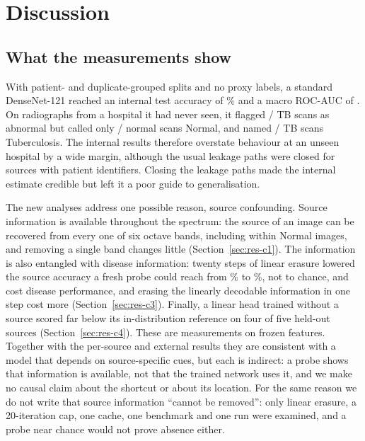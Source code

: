 \section{Discussion}
\label{sec:discussion}

\subsection{What the measurements show}
With patient- and duplicate-grouped splits and no proxy labels, a standard DenseNet-121 reached an internal test accuracy of \RTestAcc\% and a macro ROC-AUC of \RTestMacroAUC. On radiographs from a hospital it had never seen, it flagged \RExtSensK/\RExtSensN{} TB scans as abnormal but called only \RExtSpecK/\RExtSpecN{} normal scans Normal, and named \RExtTBK/\RExtTBN{} TB scans Tuberculosis. The internal results therefore overstate behaviour at an unseen hospital by a wide margin, although the usual leakage paths were closed for sources with patient identifiers. Closing the leakage paths made the internal estimate credible but left it a poor guide to generalisation.

The new analyses address one possible reason, source confounding. Source information is available throughout the spectrum: the source of an image can be recovered from every one of six octave bands, including within Normal images, and removing a single band changes little (Section~\ref{sec:res-c1}). The information is also entangled with disease information: twenty steps of linear erasure lowered the source accuracy a fresh probe could reach from \RInlpImgTestSrcBAKZero\% to \RInlpImgTestSrcBAKStar\%, not to chance, and cost disease performance, and erasing the linearly decodable information in one step cost more (Section~\ref{sec:res-c3}). Finally, a linear head trained without a source scored far below its in-distribution reference on four of five held-out sources (Section~\ref{sec:res-c4}). These are measurements on frozen features. Together with the per-source and external results they are consistent with a model that depends on source-specific cues, but each is indirect: a probe shows that information is available, not that the trained network uses it, and we make no causal claim about the shortcut or about its location. For the same reason we do not write that source information ``cannot be removed'': only linear erasure, a 20-iteration cap, one cache, one benchmark and one run were examined, and a probe near chance would not prove absence either.


